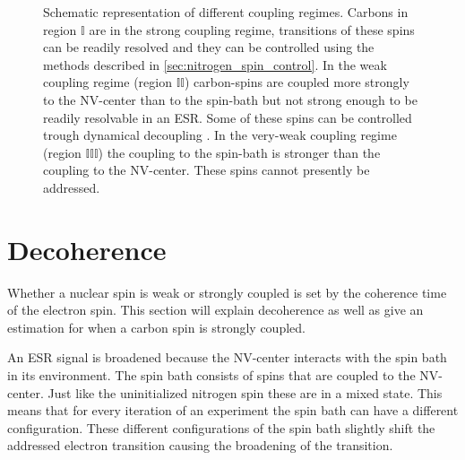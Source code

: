 \begin{figure}[htbp]
\centering
    \caption{ Schematic representation of different coupling regimes. Carbons in region $\mathbb{I} $ are in the strong coupling regime, transitions of these spins can be readily resolved and they can be controlled using the methods described in \cref{sec:nitrogen_spin_control}.
    In the weak coupling regime (region $\mathbb{II}$) carbon-spins are coupled more strongly to the NV-center than to the spin-bath but not strong enough to be readily resolvable in an ESR. Some of these spins can be controlled trough dynamical decoupling \citep{Taminiau2012Detection}.
    In the very-weak coupling regime (region $\mathbb{III}$) the coupling to the spin-bath is stronger than the coupling to the NV-center. These spins cannot presently be addressed.}
    \label{fig:coupling regimes}
\end{figure}

\section{Decoherence}
Whether a nuclear spin is weak or strongly coupled is set by the coherence time of the electron spin.
This section will explain decoherence as well as give an estimation for when a carbon spin is strongly coupled.

An ESR signal is broadened because the NV-center interacts with the spin bath in its environment.
The spin bath consists of spins that are coupled to the NV-center.
Just like the uninitialized nitrogen spin these are in a mixed state.
This means that for every iteration of an experiment the spin bath can have a different configuration.
These different configurations of the spin bath slightly shift the addressed electron transition causing the broadening of the transition.

